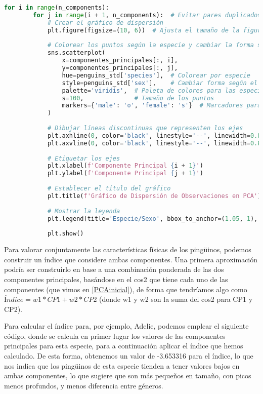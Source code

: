 \documentclass[a4paper,onecolumn]{extarticle}
\begin{document}
\begin{sloppypar}
\begin{lstlisting}[language=Python, label={lst:code}, caption={Código para la obtención del gráfico de dispersión}]
    for i in range(n_components):
        for j in range(i + 1, n_components):  # Evitar pares duplicados
            # Crear el gráfico de dispersión
            plt.figure(figsize=(10, 6))  # Ajusta el tamaño de la figura si es necesario
            
            # Colorear los puntos según la especie y cambiar la forma según el sexo
            sns.scatterplot(
                x=componentes_principales[:, i], 
                y=componentes_principales[:, j],  
                hue=penguins_std['species'],  # Colorear por especie
                style=penguins_std['sex'],    # Cambiar forma según el sexo
                palette='viridis',  # Paleta de colores para las especies
                s=100,              # Tamaño de los puntos
                markers={'male': 'o', 'female': 's'}  # Marcadores para machos y hembras
            )
            
            # Dibujar líneas discontinuas que representen los ejes
            plt.axhline(0, color='black', linestyle='--', linewidth=0.8)
            plt.axvline(0, color='black', linestyle='--', linewidth=0.8)
            
            # Etiquetar los ejes
            plt.xlabel(f'Componente Principal {i + 1}')
            plt.ylabel(f'Componente Principal {j + 1}')
            
            # Establecer el título del gráfico
            plt.title(f'Gráfico de Dispersión de Observaciones en PCA')
            
            # Mostrar la leyenda
            plt.legend(title='Especie/Sexo', bbox_to_anchor=(1.05, 1), loc='upper left')
            
            plt.show()
\end{lstlisting}

Para valorar conjuntamente las características físicas de los pingüinos, podemos construir un índice que considere ambas componentes. Una primera aproximación 
podría ser construirlo en base a una combinación ponderada de las dos componentes principales, basándose en el cos2 que tiene cada uno de las componentes 
(que vimos en \ref{PCAinicial}), de forma que tendríamos algo como $Índice = w1*CP1 + w2*CP2$ (donde w1 y w2 son la suma del cos2 para CP1 y CP2). 

Para calcular el índice para, por ejemplo, Adelie, podemos emplear el siguiente código, donde se calcula en primer lugar los valores de las componentes 
principales para esta especie, para a continuación aplicar el índice que hemos calculado. De esta forma, obtenemos un valor de -3.653316 para el índice, lo que 
nos indica que los pingüinos de esta especie tienden a tener valores bajos en ambas componentes, lo que sugiere que son más pequeños en tamaño, con picos menos 
profundos, y menos diferencia entre géneros.


\end{sloppypar}
\end{document}
